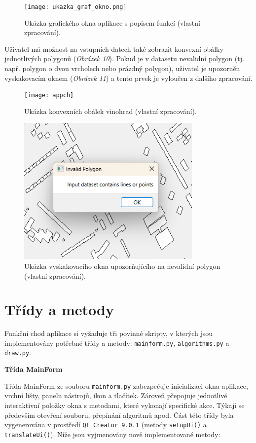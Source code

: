 \begin{figure}[h]
\centering
\texttt{[image: ukazka\_graf\_okno.png]}
    \caption{Ukázka grafického okna aplikace s popisem funkcí (vlastní zpracování).}
\end{figure}

\par Uživatel má možnost na vstupních datech také zobrazit konvexní obálky jednotlivých polygonů (\emph{Obrázek 10}). Pokud je v datasetu nevalidní polygon (tj. např. polygon o dvou vrcholech nebo prázdný polygon), uživatel je upozorněn vyskakovacím oknem (\emph{Obrázek 11}) a tento prvek je vyloučen z dalšího zpracování.

\begin{figure}[h]
\centering
\texttt{[image: appch]}
    \caption{Ukázka konvexních obálek vinohrad (vlastní zpracování).}
\end{figure}

\begin{figure}[h]
\centering
\includegraphics[width=9cm]{images/invalidinput.png}
    \caption{Ukázka vyskakovacího okna upozorňujícího na nevalidní polygon (vlastní zpracování).}
\end{figure}

\bigbreak

\section*{Třídy a metody}
\par Funkční chod aplikace si vyžaduje tři povinné skripty, v kterých jsou implementovány potřebné třídy a metody: \verb|mainform.py|, \verb|algorithms.py| a \verb|draw.py|.

\bigbreak

\par {\large\textbf{Třída MainForm} }
\par Třída MainForm ze souboru \verb|mainform.py| zabezpečuje inicializaci okna aplikace, vrchní lišty, panelu nástrojů, ikon a tlačítek. Zároveň přepojuje jednotlivé interaktivní položky okna s metodami, které vykonají specifické akce. Týkají se především otevření souboru, přepínání algoritmů apod. Část této třídy byla vygenerována v prostředí \verb|Qt Creator 9.0.1| (metody \verb|setupUi()| a \verb|translateUi()|). Níže jsou vyjmenovány nově implementované metody:

